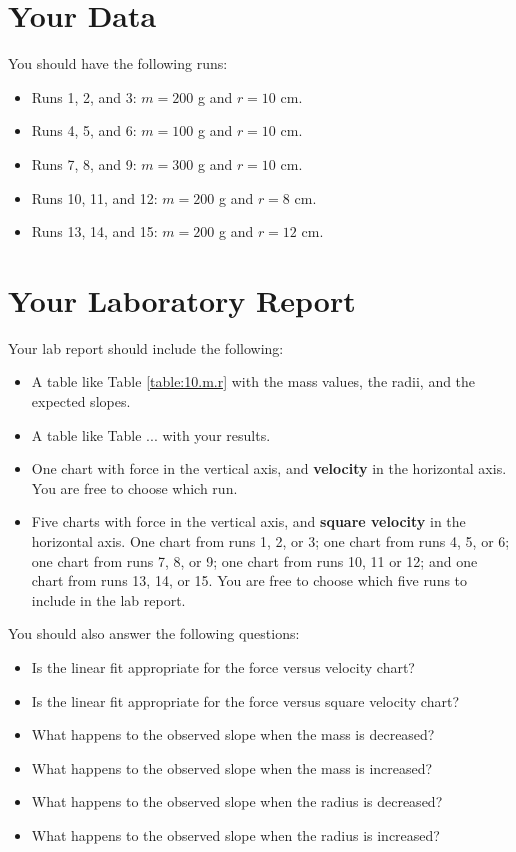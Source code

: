\section{Your Data}
You should have the following runs:
\begin{itemize}
    \item Runs 1, 2, and 3: $m = 200$ g and $r = 10$ cm.
    \item Runs 4, 5, and 6: $m = 100$ g and $r = 10$ cm.
    \item Runs 7, 8, and 9: $m = 300$ g and $r = 10$ cm.
    \item Runs 10, 11, and 12: $m = 200$ g and $r = 8$ cm.
    \item Runs 13, 14, and 15: $m = 200$ g and $r = 12$ cm.
\end{itemize}
\newpage
\section{Your Laboratory Report}
Your lab report should include the following:
\begin{itemize}
    \item A table like Table \ref{table:10.m.r} with the mass values, the radii, and the expected slopes.
    \item A table like Table ... with your results.
    \item One chart with force in the vertical axis, and \textbf{velocity} in the horizontal axis. You are free to choose which run.
    \item Five charts with force in the vertical axis, and \textbf{square velocity} in the horizontal axis. One chart from runs 1, 2, or 3; one chart from runs 4, 5, or 6; one chart from runs 7, 8, or 9; one chart from runs 10, 11 or 12; and one chart from runs 13, 14, or 15. You are free to choose which five runs to include in the lab report.
\end{itemize}
You should also answer the following questions:
\begin{itemize}
    \item Is the linear fit appropriate for the force versus velocity chart?
    \item Is the linear fit appropriate for the force versus square velocity chart?
    \item What happens to the observed slope when the mass is decreased?
    \item What happens to the observed slope when the mass is increased?
    \item What happens to the observed slope when the radius is decreased?
    \item What happens to the observed slope when the radius is increased?
\end{itemize}
\newpage

